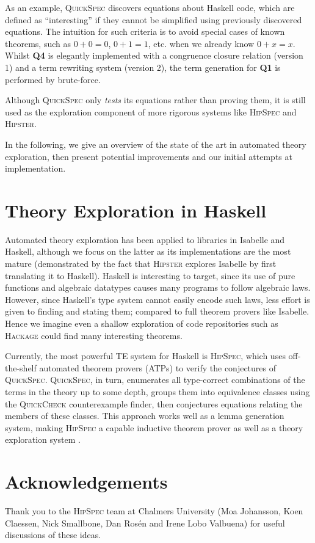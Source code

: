 \documentclass[]{article}
\begin{document}
As an example, \textsc{QuickSpec} \cite{QuickSpec} discovers equations about
Haskell code, which are defined as ``interesting'' if they cannot be simplified
using previously discovered equations. The intuition for such criteria is to
avoid special cases of known theorems, such as $0 + 0 = 0$, $0 + 1 = 1$, etc.
when we already know $0 + x = x$. Whilst \textbf{Q4} is elegantly implemented
with a congruence closure relation (version 1) and a term rewriting system
(version 2), the term generation for \textbf{Q1} is performed by brute-force.

Although \textsc{QuickSpec} only \emph{tests} its equations rather than
proving them, it is still used as the exploration component of more rigorous
systems like \textsc{HipSpec} and \textsc{Hipster}.

In the following, we give an overview of the state of the art in automated
theory exploration, then present potential improvements and our initial attempts
at implementation.

\section{Theory Exploration in Haskell}\label{haskell}

Automated theory exploration has been applied to libraries in Isabelle
and Haskell, although we focus on the latter as its implementations are
the most mature (demonstrated by the fact that \textsc{Hipster} explores
Isabelle by first translating it to Haskell). Haskell is interesting to target,
since its use of pure functions and algebraic datatypes causes many programs to
follow algebraic laws. However, since Haskell's type system cannot easily
encode such laws, less effort is given to finding and stating them; compared to
full theorem provers like Isabelle. Hence we imagine even a shallow exploration
of code repositories such as \textsc{Hackage} could find many interesting
theorems.

Currently, the most powerful TE system for Haskell is \textsc{HipSpec}, which
uses off-the-shelf automated theorem provers (ATPs) to verify the conjectures of
\textsc{QuickSpec}. \textsc{QuickSpec}, in turn, enumerates all type-correct combinations
of the terms in the theory up to some depth, groups them into equivalence
classes using the \textsc{QuickCheck} counterexample finder, then conjectures
equations relating the members of these classes. This approach works well as a
lemma generation system, making \textsc{HipSpec} a capable inductive theorem
prover as well as a theory exploration system \cite{claessen2013automating}.

\section*{Acknowledgements}

Thank you to the \textsc{HipSpec} team at Chalmers University (Moa Johansson,
Koen Claessen, Nick Smallbone, Dan Ros{\'e}n and Irene Lobo Valbuena) for useful
discussions of these ideas.

\fi



\end{document}
